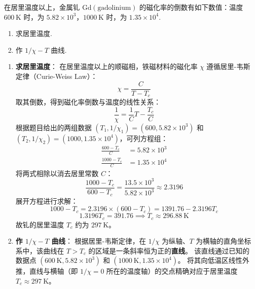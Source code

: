 \begin{exercise}\label{ex:19.8}
在居里温度以上，金属钆 $\mathrm{Gd(gadolinium)}$ 的磁化率的倒数有如下数值：温度 $600 \ \mathrm{K}$ 时，为 $5.82 \times 10^3$，$1000 \ \mathrm{K}$ 时，为 $1.35 \times 10^4$. 
\begin{enumerate}
  \item[(a)] 求居里温度. 
  \item[(b)] 作 $1/\chi - T$ 曲线.
\end{enumerate}
\end{exercise}
\begin{solution}
\begin{enumerate}
    \item[(a)] \textbf{求居里温度}：
    在居里温度以上的顺磁相，铁磁材料的磁化率 $\chi$ 遵循居里-韦斯定律（Curie-Weiss Law）：
    $$ \chi = \frac{C}{T - T_c} $$
    取其倒数，得到磁化率倒数与温度的线性关系：
    $$ \frac{1}{\chi} = \frac{1}{C} T - \frac{T_c}{C} $$
    根据题目给出的两组数据 $(T_1, 1/\chi_1) = (600, 5.82 \times 10^3)$ 和 $(T_2, 1/\chi_2) = (1000, 1.35 \times 10^4)$，可列方程组：
    \begin{align*}
        \frac{600 - T_c}{C} &= 5.82 \times 10^3 \\
        \frac{1000 - T_c}{C} &= 1.35 \times 10^4
    \end{align*}
    将两式相除以消去居里常数 $C$：
    $$ \frac{1000 - T_c}{600 - T_c} = \frac{13.5 \times 10^3}{5.82 \times 10^3} \approx 2.3196 $$
    展开方程进行求解：
    $$ 1000 - T_c = 2.3196 \times (600 - T_c) = 1391.76 - 2.3196 T_c $$
    $$ 1.3196 T_c = 391.76 \implies T_c \approx 296.88 \ \mathrm{K} $$
    故钆的居里温度 $T_c$ 约为 $297 \ \mathrm{K}$。

    \item[(b)] \textbf{作 $1/\chi - T$ 曲线}：
    根据居里-韦斯定律，在 $1/\chi$ 为纵轴、$T$ 为横轴的直角坐标系中，该曲线在 $T > T_c$ 的区域是一条斜率恒为正的\textbf{直线}。
    该直线通过已知的数据点 $(600 \ \mathrm{K}, 5.82 \times 10^3)$ 和 $(1000 \ \mathrm{K}, 1.35 \times 10^4)$。
    将其向低温区线性外推，直线与横轴（即 $1/\chi = 0$ 所在的温度轴）的交点精确对应于居里温度 $T_c \approx 297 \ \mathrm{K}$。
\end{enumerate}
\end{solution}

